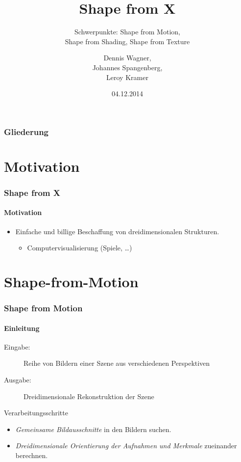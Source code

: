 \documentclass{beamer}
\title{Shape from X}
\subtitle{Schwerpunkte: Shape from Motion, \\ Shape from Shading, Shape from Texture}
\author{Dennis Wagner, \\ Johannes Spangenberg, \\ Leroy Kramer}
\date{04.12.2014}
\begin{document}
\begin{acronym}[SIFT]
\end{acronym}


\frame{\titlepage} 


\begin{frame}
	\frametitle{Gliederung}
	\tableofcontents
\end{frame} 


\section{Motivation} 
\begin{frame}
	\frametitle{Shape from X}
	\framesubtitle{Motivation}
	
	\begin{itemize}
		\item Einfache und billige Beschaffung von dreidimensionalen Strukturen.
		\begin{itemize}
			\item Computervisualisierung (Spiele, \dots)
		\end{itemize}
	\end{itemize}
\end{frame}


\section{Shape-from-Motion}
\begin{frame}
	\frametitle{Shape from Motion}
	\framesubtitle{Einleitung}

	\begin{description}
		\item[Eingabe:] Reihe von Bildern einer Szene aus verschiedenen Perspektiven
		\item[Ausgabe:] Dreidimensionale Rekonstruktion der Szene
	\end{description}

	\begin{block}{Verarbeitungsschritte}
		\begin{itemize}
			\item \emph{Gemeinsame Bildausschnitte} in den Bildern suchen.
			\item \emph{Dreidimensionale Orientierung der Aufnahmen und Merkmale} zueinander berechnen.
		\end{itemize}
	\end{block}
\end{frame}
\end{document}
